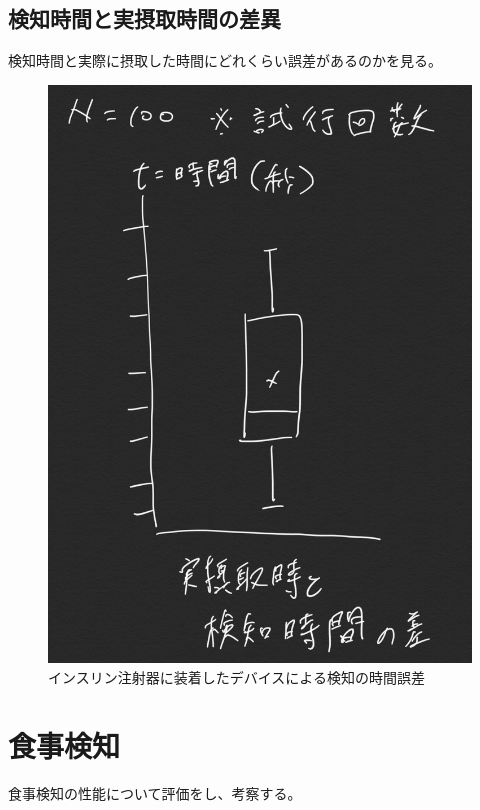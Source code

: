 \subsection{検知時間と実摂取時間の差異}
検知時間と実際に摂取した時間にどれくらい誤差があるのかを見る。

\begin{figure}[htbp]
  \caption{インスリン注射器に装着したデバイスによる検知の時間誤差}
  \label{fig:insulin_box_n_whisker}
  \begin{center}
    \includegraphics[bb=0 0 1000 850,width=20cm]{assets/insulin_box_n_whisker.png}
  \end{center}
\end{figure}

\section{食事検知}
食事検知の性能について評価をし、考察する。

